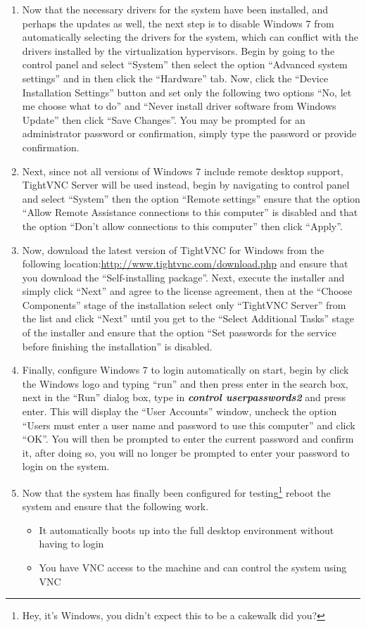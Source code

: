 \begin{enumerate}
\item	Now that the necessary drivers for the system have been installed, and perhaps the updates as well, the next step is to disable
		Windows 7 from automatically selecting the drivers for the system, which can conflict with the drivers installed by the
		virtualization hypervisors. Begin by going to the control panel and select ``System'' then select the option ``Advanced
		system settings'' and in then click the ``Hardware'' tab. Now, click the ``Device Installation Settings'' button and
		set only the following two options ``No, let me choose what to do'' and ``Never install driver software from Windows
		Update'' then click ``Save Changes''. You may be prompted for an administrator password or confirmation, simply 
		type the password or provide confirmation.
		
		
\item	Next, since not all versions of Windows 7 include remote desktop support, TightVNC Server will be used instead, begin
		by navigating to control panel and select ``System'' then the option ``Remote settings'' ensure that the option
		``Allow Remote Assistance connections to this computer'' is disabled and that the option ``Don't allow connections
		to this computer'' then click ``Apply''.
		
\item	Now, download the latest version of TightVNC for Windows from the following location:\url{http://www.tightvnc.com/download.php}
		and ensure that you download the ``Self-installing package''. Next, execute the installer and simply click ``Next'' and agree
		to the license agreement, then at the ``Choose Components'' stage of the installation select only ``TightVNC Server'' from
		the list and click ``Next'' until you get to the ``Select Additional Tasks'' stage of the installer and ensure that the
		option ``Set passwords for the service before finishing the installation'' is disabled.
		
\item	Finally, configure Windows 7 to login automatically on start, begin by click the Windows logo and typing ``run'' and then press
		enter in the search box, next in the ``Run'' dialog box, type in \emph{\bf control userpasswords2} and press enter. This will
		display the ``User Accounts'' window, uncheck the option ``Users must enter a user name and password to use this computer''
		and click ``OK''. You will then be prompted to enter the current password and confirm it, after doing so, you will no longer 
		be prompted to enter your password to login on the system.

\item	Now that the system has finally been configured for testing\footnote{Hey, it's Windows, you didn't expect this to be a cakewalk
		did you?} reboot the system and ensure that the following work.
\begin{itemize}
\item	It automatically boots up into the full desktop environment without having to login
\item	You have VNC access to the machine and can control the system using VNC	
\end{itemize}
\end{enumerate}


